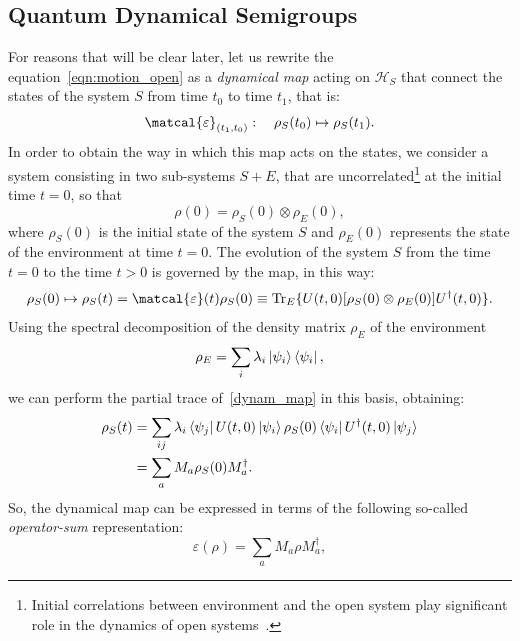 \subsection{Quantum Dynamical Semigroups}
For reasons that will be clear later, let us rewrite the equation~\ref{eqn:motion_open} as a \emph{dynamical map} acting on $\mathcal{H}_S$ that connect the states of the system $S$ from time $t_0$ to time $t_1$, that is:
\begin{equation}
    \matcal{\varepsilon}_{(t_1, t_0)}: \quad \rho_S(t_0) \mapsto \rho_S(t_1).
\end{equation}
In order to obtain the way in which this map acts on the states, we consider a system consisting in two sub-systems $S+E$, that are uncorrelated\footnote{Initial correlations between environment and the open system play significant role in the dynamics of open systems~\cite{PhysRevA.64.062106}.} at the initial time $t=0$, so that 
\begin{equation}
    \rho(0) = \rho_S(0) \otimes \rho_E(0),
\end{equation}
where $\rho_S(0)$ is the initial state of the system $S$ and $\rho_E(0)$ represents the state of the environment at time $t=0$. The evolution of the system $S$ from the time $t=0$ to the time $t>0$ is governed by the map, in this way:
\begin{equation}
\label{dynam_map}
    \rho_S(0) \mapsto \rho_S(t) = \matcal{\varepsilon}(t)\rho_S(0) \equiv \Tr_E \{U(t, 0)[\rho_S(0) \otimes \rho_E(0)] U^\dagger(t,0)\}.
\end{equation}
Using the spectral decomposition of the density matrix $\rho_E$ of the environment
\begin{equation*}
    \rho_E = \sum_i \lambda_i \ket{\psi_i}\bra{\psi_i},
\end{equation*}
we can perform the partial trace of~\ref{dynam_map} in this basis, obtaining:
\begin{equation}
\begin{split}
    \rho_S(t) &= \sum_{ij} \lambda_i \bra{\psi_j}U(t,0)\ket{\psi_i}\rho_S(0) \bra{\psi_i}U^\dagger(t,0)\ket{\psi_j}\\
                &= \sum_a M_a \rho_S(0) M_a^\dagger.
\end{split}
\end{equation}
So, the dynamical map can be expressed in terms of the following so-called \emph{operator-sum} representation:
\begin{equation}
    \varepsilon(\rho) = \sum_a M_a \rho M_a^\dagger,
\end{equation}
